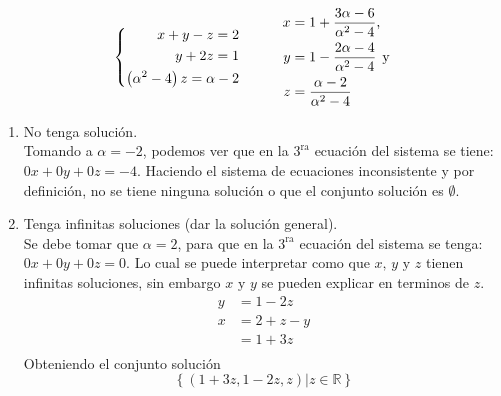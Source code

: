 \documentclass{article}
\begin{document}
\begin{enumerate}
        \[
            \left\{
                \begin{aligned}
                    x + y - z = 2 \\
                    y + 2z = 1 \\
                    \left(\alpha^2 - 4\right)z = \alpha - 2
                \end{aligned}
            \right.
            \hspace{1cm}
            \begin{aligned}
                x &= 1 + \frac{3\alpha - 6}{\alpha^2 - 4} \text{,} \\
                y &= 1 - \frac{2\alpha - 4}{\alpha^2 - 4} \hspace{1ex} \text{y}  \\
                z &= \frac{\alpha - 2}{\alpha^2 - 4}
            \end{aligned}
        \]
        \begin{enumerate}[label=\listAlph]
            \item No tenga solución. \\
                Tomando a \(\alpha = -2\), podemos ver que en la \(3^{\text{ra}}\) ecuación del sistema se tiene: \(0x + 0y + 0z = -4\). 
                Haciendo el sistema de ecuaciones inconsistente y por definición, no se tiene ninguna solución o que el conjunto solución es \(\emptyset\).
            \item Tenga infinitas soluciones (dar la solución general). \\
                Se debe tomar que \(\alpha = 2\), para que en la \(3^{\text{ra}}\) ecuación del sistema se tenga: \(0x + 0y + 0z = 0\).
                Lo cual se puede interpretar como  que \(x \text{, } y \text{ y } z\) tienen infinitas soluciones, 
                sin embargo \(x \text{ y } y\) se pueden explicar en terminos de \(z\).
                \[
                    \begin{aligned}
                        y &= 1 - 2z \\
                        x &= 2 + z - y \\
                        &= 1 + 3z \\
                    \end{aligned}
                \]
                Obteniendo el conjunto solución
                \[
                    \left\{\left(1 + 3z, 1 - 2z, z\right) | z \in \mathbb{R} \right\}
                \]


\end{enumerate}
\end{enumerate}
\end{document}
